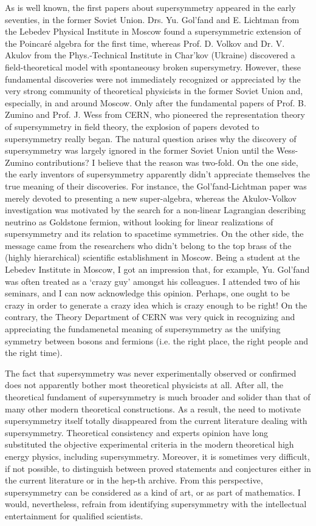 \documentclass[a4paper,a4paper]{article}
\begin{document}
As is well known, the first papers about supersymmetry appeared in the early
seventies, in the former Soviet Union. Drs. Yu. Gol'fand and E. Lichtman from
the Lebedev Physical Institute in Moscow found a supersymmetric extension of
 the Poincar\'e algebra for the first time, whereas Prof. D. Volkov and
Dr. V. Akulov from the Phys.-Technical Institute in Char'kov (Ukraine) 
discovered a field-theoretical model with spontaneousy broken supersymetry.
However, these fundamental discoveries were not immediately recognized or
appreciated by the very strong community of theoretical physicists in the 
former Soviet Union and, especially, in and around Moscow. Only after the 
fundamental papers of Prof. B. Zumino and Prof. J. Wess from CERN, 
who pioneered the representation theory of supersymmetry in field theory, 
the explosion of papers devoted to supersymmetry really began. 
The natural question arises why
the discovery of supersymmetry was largely ignored in the former Soviet Union
until the Wess-Zumino contributions? 
I believe that the reason was two-fold. On the
one side, the early inventors of supersymmetry apparently didn't appreciate 
themselves the true meaning of their discoveries. For instance, the 
Gol'fand-Lichtman paper was merely devoted to presenting a new super-algebra, 
 whereas the Akulov-Volkov investigation was motivated by the search for a
non-linear Lagrangian describing neutrino as Goldstone fermion, without looking
 for linear realizations of supersymmetry and its relation to spacetime 
symmetries. On the other side, the message came from the researchers who 
didn't  belong to the top brass of the (highly hierarchical) scientific 
establishment in Moscow. Being a student at the Lebedev Institute in Moscow, 
I got an impression that, for example, Yu. Gol'fand was often treated as 
a `crazy guy' amongst his colleagues. I attended two of his seminars, and
I can now acknowledge this opinion. Perhaps, one ought to be crazy in 
order to generate a crazy idea which is crazy enough to be right! On the
contrary, the Theory Department of CERN was very quick in recognizing and 
appreciating the fundamenetal meaning of supersymmetry as the unifying 
symmetry between bosons and fermions (i.e. the right place, the right people 
and the right time). 
 
The fact that supersymmetry was never experimentally observed or confirmed 
does not apparently bother most theoretical physicists at all. After all, the
theoretical fundament of supersymmetry is much broader and solider than that
of many other modern theoretical constructions. As a result, the need to
motivate supersymmetry itself totally disappeared from the current literature
dealing with supersymmetry. Theoretical consistency and experts opinion
have long substituted the objective experimental criteria in the modern
theoretical high energy physics, including supersymmetry. Moreover, it is
sometimes very difficult, if not possible, to distinguish between proved
statements and conjectures either in the current literature or in the 
hep-th archive. From this perspective, supersymmetry can be considered as a 
kind of art, or as part of mathematics. I would, nevertheless, refrain from 
identifying supersymmetry with the intellectual entertainment for qualified 
scientists.  
\end{document}
